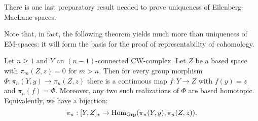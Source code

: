 

There is one last preparatory result needed to prove uniqueness of Eilenberg-MacLane spaces.

Note that, in fact, the following theorem yields much more than uniqueness of EM-spaces: it will form the basis for the proof of representability of cohomology.

\begin{theorem}\label{theorem:correspondence-maps-and-group-morphisms}
Let $n\geq1$ and $Y$ an $(n-1)$-connected CW-complex. Let $Z$ be a based space with $\pi_m(Z,z)=0$ for $m>n$. Then for every group morphism $\Phi:\pi_n(Y,y)\to\pi_n(Z,z)$ there is a continuous map $f:Y\to Z$ with $f(y)=z$ and $\pi_n(f)=\Phi$. Moreover, any two such realizations of $\Phi$ are based homotopic. Equivalently, we have a bijection:
\[\pi_n:[Y,Z]_*\to\operatorname{Hom}_{\mathrm{Grp}}(\pi_n(Y,y),\pi_n(Z,z)).\]
\end{theorem}

